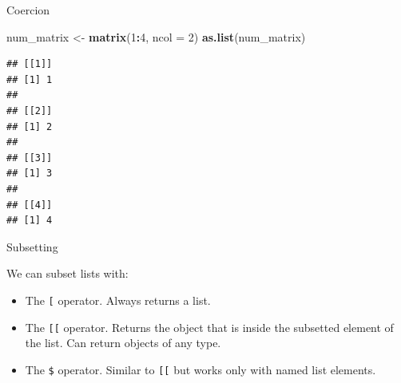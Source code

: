 \documentclass[ignorenonframetext,]{beamer}
\newenvironment{Shaded}{\begin{snugshade}}{\end{snugshade}}
\newcommand{\DataTypeTok}[1]{\textcolor[rgb]{0.13,0.29,0.53}{#1}}
\newcommand{\DecValTok}[1]{\textcolor[rgb]{0.00,0.00,0.81}{#1}}
\newcommand{\KeywordTok}[1]{\textcolor[rgb]{0.13,0.29,0.53}{\textbf{#1}}}
\newcommand{\NormalTok}[1]{#1}
\newcommand{\OperatorTok}[1]{\textcolor[rgb]{0.81,0.36,0.00}{\textbf{#1}}}
\newcommand{\StringTok}[1]{\textcolor[rgb]{0.31,0.60,0.02}{#1}}
\providecommand{\tightlist}{%
  \setlength{\itemsep}{0pt}\setlength{\parskip}{0pt}}
\begin{document}
\begin{frame}[fragile]{Coercion}
\protect\hypertarget{coercion-1}{}

\begin{Shaded}
\begin{Highlighting}[]
\NormalTok{num_matrix <-}\StringTok{ }\KeywordTok{matrix}\NormalTok{(}\DecValTok{1}\OperatorTok{:}\DecValTok{4}\NormalTok{, }\DataTypeTok{ncol =} \DecValTok{2}\NormalTok{)}
\KeywordTok{as.list}\NormalTok{(num_matrix)}
\end{Highlighting}
\end{Shaded}

\begin{verbatim}
## [[1]]
## [1] 1
## 
## [[2]]
## [1] 2
## 
## [[3]]
## [1] 3
## 
## [[4]]
## [1] 4
\end{verbatim}

\end{frame}

\begin{frame}[fragile]{Subsetting}
\protect\hypertarget{subsetting}{}

We can subset lists with:

\begin{itemize}
\tightlist
\item
  The \texttt{{[}} operator. Always returns a list.
\item
  The \texttt{{[}{[}} operator. Returns the object that is inside the
  subsetted element of the list. Can return objects of any type.
\item
  The \texttt{\$} operator. Similar to \texttt{{[}{[}} but works only
  with named list elements.
\end{itemize}

\end{frame}
\end{document}
